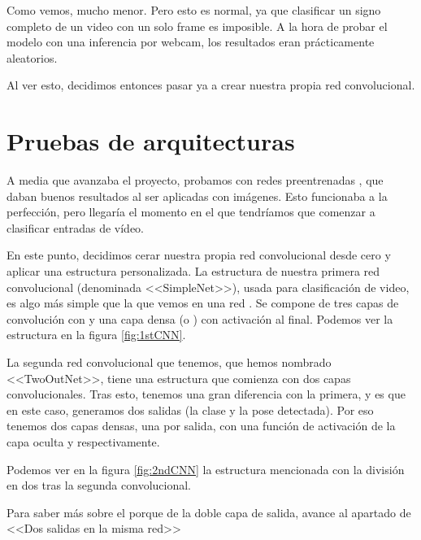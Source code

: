 Como vemos, mucho menor. Pero esto es normal, ya que clasificar un signo completo de un video con un solo frame es imposible. A la hora de probar el modelo con una inferencia por webcam, los resultados eran prácticamente aleatorios.

Al ver esto, decidimos entonces pasar ya a crear nuestra propia red convolucional.


\section{Pruebas de arquitecturas}

A media que avanzaba el proyecto, probamos con redes preentrenadas , que daban buenos resultados al ser aplicadas con imágenes. Esto funcionaba a la perfección, pero llegaría el momento en el que tendríamos que comenzar a clasificar entradas de vídeo.

En este punto, decidimos cerar nuestra propia red convolucional desde cero y aplicar una estructura personalizada. La estructura de nuestra primera red convolucional (denominada <<SimpleNet>>), usada para clasificación de video, es algo más simple que la que vemos en una red . Se compone de tres capas de convolución con  y una capa densa (o ) con activación  al final. Podemos ver la estructura en la figura \ref{fig:1stCNN}.


La segunda red convolucional que tenemos, que hemos nombrado <<TwoOutNet>>, tiene una estructura que comienza con dos capas convolucionales. Tras esto, tenemos una gran diferencia con la primera, y es que en este caso, generamos dos salidas (la clase y la pose detectada). Por eso tenemos dos capas densas, una por salida, con una función de activación de la capa oculta  y  respectivamente.

Podemos ver en la figura \ref{fig:2ndCNN} la estructura mencionada con la división en dos tras la segunda convolucional.


Para saber más sobre el porque de la doble capa de salida, avance al apartado de <<Dos salidas en la misma red>>

